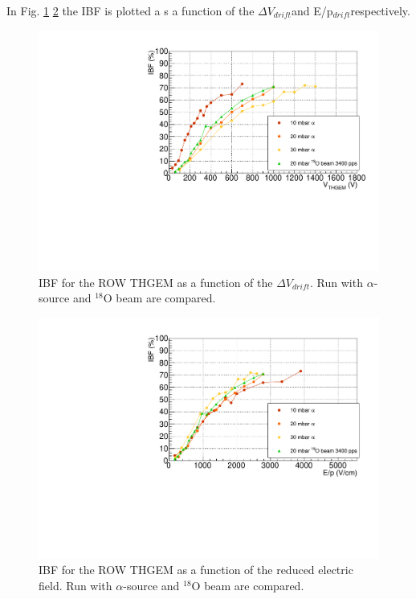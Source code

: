 \documentclass[a4paper, 11 pt]{report}
\newcommand{\Vdrift}{$ \Delta V_{drift}$}
\newcommand{\Edrift}{E/p$_{drift}$}
\begin{document}
  In Fig. \ref{fig:IBF_ROW_beam} \ref{fig:IBF_ROW_beam_F} the IBF is plotted a s a function of the
  \Vdrift and \Edrift respectively.  
  \begin{figure}[htbp]
	\centering
	\includegraphics[width=\textwidth]{Immagini/IBF_ROW_Comparison_1.pdf}
	\caption{IBF for the ROW THGEM as a function of the \Vdrift. Run with 
	$\alpha$-source	and $^{18}$O beam are compared.}
	\label{fig:IBF_ROW_beam}
  \end{figure}
  \begin{figure}[htbp]
	\centering
	\includegraphics[width=\textwidth]{Immagini/IBF_ROW_Comparison_F_1.pdf}
	\caption{IBF for the ROW THGEM as a function of the reduced electric field. Run with 
	$\alpha$-source	and $^{18}$O beam are compared.}
	\label{fig:IBF_ROW_beam_F}
  \end{figure}
\end{document}
